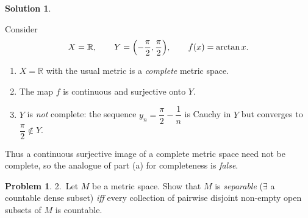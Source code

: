 \documentclass[12pt]{article}
\theoremstyle{definition} %
\newtheorem{solution}{Solution}
\newtheorem{problem}{Problem}
\theoremstyle{plain} %
\begin{document}
\begin{solution}
\begin{enumerate}[]
  Consider
  \[
     X=\mathbb{R}, 
     \qquad    
     Y=\Bigl(-\frac{\pi}{2},\frac{\pi}{2}\Bigr),
     \qquad    
     f(x)=\arctan x .
  \]
  
  \begin{enumerate}[]
  \item \(X=\mathbb{R}\) with the usual metric is a \emph{complete} metric space.
  
  \item The map \(f\) is continuous and surjective onto \(Y\).
  
  \item \(Y\) is \emph{not} complete: the sequence  
        \(y_n=\dfrac{\pi}{2}-\dfrac{1}{n}\) is Cauchy in \(Y\) but converges to  
        \(\dfrac{\pi}{2}\notin Y\).
  \end{enumerate}
  
  Thus a continuous surjective image of a complete metric space need not be complete, so the analogue of part (a) for completeness is \emph{false}.
  \end{enumerate}
  \end{solution}
  \begin{problem}
    2.\ Let \(M\) be a metric space.  Show that \(M\) is \emph{separable}  
    (\(\exists\) a countable dense subset) \emph{iff} every collection of pairwise disjoint non-empty open subsets of \(M\) is countable.
    \end{problem}
    
\end{document}
